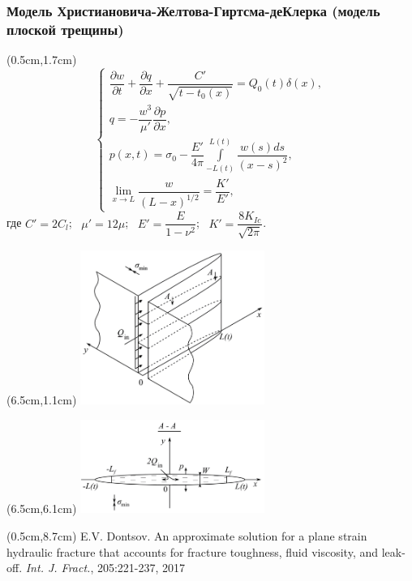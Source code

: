 \documentclass{beamer}
\begin{document}
\begin{frame}
\frametitle{Модель Христиановича-Желтова-Гиртсма-деКлерка (модель плоской трещины)}

\footnotesize

\begin{textblock*}{6cm}(0.5cm,1.7cm)
$$
\begin{cases}
\dfrac{\partial w}{\partial t}+\dfrac{\partial q}{\partial x}+\dfrac{C'}{\sqrt{t-t_0(x)}}=Q_0(t)\delta(x),\\[15pt]
q=-\dfrac{w^3}{\mu'}\dfrac{\partial p}{\partial x},\\[5pt]
p(x,t)=\sigma_0-\dfrac{E'}{4\pi}\displaystyle\int\limits_{-L(t)}^{L(t)}\dfrac{w(s)ds}{(x-s)^2},\\[20pt]
\displaystyle\lim_{x\to L}\dfrac{w}{(L-x)^{1/2}}=\dfrac{K'}{E'},
\end{cases}
$$
где $C'=2C_l$; $\,\,\,\mu'=12\mu$; $\,\,\,E'=\dfrac{E}{1-\nu^2}$; $\,\,\,K'=\dfrac{8K_{Ic}}{\sqrt{2\pi}}$.
\end{textblock*}

\begin{textblock*}{8cm}(6.5cm,1.1cm)
\includegraphics[width=6cm]{kgd_model_3D.jpg}
\end{textblock*}

\begin{textblock*}{8cm}(6.5cm,6.1cm)
\includegraphics[width=6cm]{kgd_model_A-A_plane.jpg}
\end{textblock*}

\begin{textblock*}{6cm}(0.5cm,8.7cm)
\tiny
\textcolor{lit_gray}{E.V. Dontsov. An approximate solution for a plane strain hydraulic fracture that accounts for fracture toughness, fluid viscosity, and leak-off. \emph{Int. J. Fract.}, 205:221-237, 2017}
\end{textblock*}

\normalsize

\end{frame}
\end{document}
